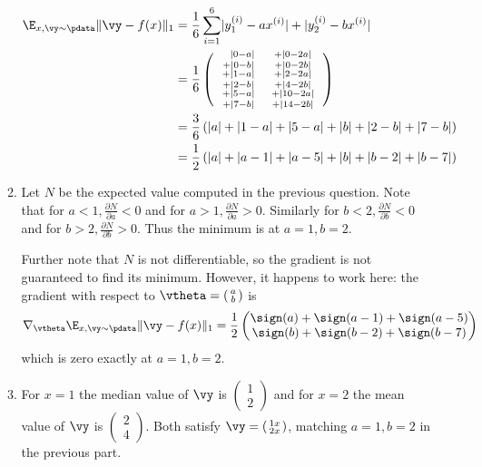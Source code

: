 \documentclass{article}
\newcommand{\twovector}[2]{ \begin{smallmatrix} #1 \\ #2 \end{smallmatrix} }
\newcommand{\ptwovector}[2]{ \left( \twovector{#1}{#2} \right) }
\begin{document}
\begin{enumerate}
\begin{enumerate}
    \begin{align*}
        \E_{x,\vy\sim\pdata}\lVert \vy - f(x)\rVert_1 & = \frac16 \sum_{i=1}^6 \lvert y^{(i)}_1-ax^{(i)}\rvert + \lvert y^{(i)}_2-bx^{(i)} \rvert \\
        & = \frac{1}{6} \left(
                \begin{array}{c c}
                \twovector{\phantom{+}\lvert 0-a \rvert}{+\lvert 0-b \rvert} & \twovector{+\lvert 0 -2a \rvert}{+\lvert 0 -2b \rvert} \\
                \twovector{         + \lvert 1-a \rvert}{+\lvert 2-b \rvert} & \twovector{+\lvert 2 -2a \rvert}{+\lvert 4 -2b \rvert} \\
                \twovector{         + \lvert 5-a \rvert}{+\lvert 7-b \rvert} & \twovector{+\lvert 10-2a \rvert}{+\lvert 14-2b \rvert} \\
                \end{array}
                \right) \\
        & = \frac36 \left( \lvert a \rvert + \lvert 1-a \rvert + \lvert 5-a \rvert + 
                           \lvert b \rvert + \lvert 2-b \rvert + \lvert 7-b \rvert \right) \\
        & = \frac12 \left( \lvert a \rvert + \lvert a-1 \rvert + \lvert a-5 \rvert + 
                           \lvert b \rvert + \lvert b-2 \rvert + \lvert b-7 \rvert \right)
        \end{align*} 
    \item Let $N$ be the expected value computed in the previous question. Note that for $a < 1, \frac{\partial N}{\partial a} < 0$ and for $a > 1, \frac{\partial N}{\partial a} > 0$. Similarly for $b < 2, \frac{\partial N}{\partial b} < 0$ and for $b > 2, \frac{\partial N}{\partial b} > 0$. Thus the minimum is at $a = 1, b = 2$. 
    
    Further note that $N$ is not differentiable, so the gradient is not guaranteed to find its minimum. However, it happens to work here: the gradient with respect to $\vtheta = \ptwovector{a}{b}$ is
    \begin{equation*}
        \nabla_\vtheta \E_{x,\vy\sim\pdata}\lVert \vy - f(x)\rVert_1 = \frac12 \begin{pmatrix} \sign(a) + \sign(a-1) + \sign(a-5) \\
                                                 \sign(b) + \sign(b-2) + \sign(b-7) \end{pmatrix}
    \end{equation*}
    which is zero exactly at $a = 1, b = 2$. 
    \item For $x = 1$ the median value of $\vy$ is $\ptwovector{1}{2}$ and for $x = 2$ the mean value of $\vy$ is $\ptwovector{2}{4}$. Both satisfy $\vy = \ptwovector{1x}{2x}$, matching $a=1, b=2$ in the previous part.
\end{enumerate}


\end{enumerate}
\end{document}
